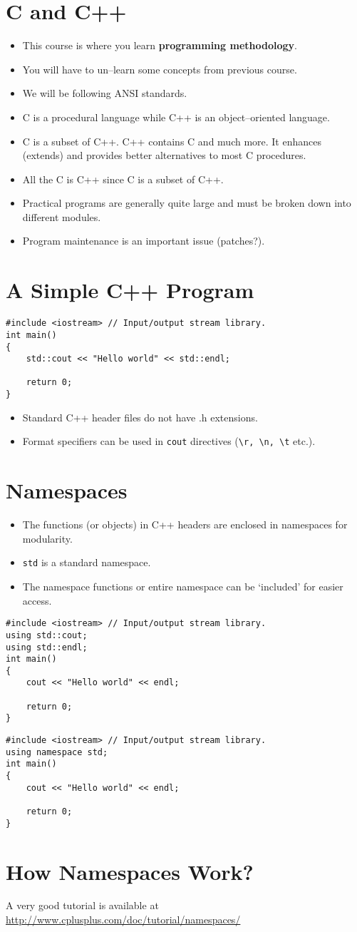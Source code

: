 \documentclass[12pt,a4paper]{article}
\begin{document}
\section{C and C++}
\begin{itemize}
\item This course is where you learn \textbf{programming methodology}.
\item You will have to un--learn some concepts from previous course.
\item We will be following ANSI standards.
\item C is a procedural language while C++ is an object--oriented language.
\item C is a subset of C++. C++ contains C and much more. It enhances (extends) and provides better alternatives to most C procedures.
\item All the C is C++ since C is a subset of C++.
\item Practical programs are generally quite large and must be broken down into different modules.
\item Program maintenance is an important issue (patches?).
\end{itemize}
\section{A Simple C++ Program}
\begin{lstlisting}[caption={A Basic C++ Program}]
#include <iostream> // Input/output stream library.
int main()
{
	std::cout << "Hello world" << std::endl;
	
	return 0;
}
\end{lstlisting}
\begin{itemize}
\item Standard C++ header files do not have .h extensions.
\item Format specifiers can be used in \verb|cout| directives (\verb|\r, \n, \t| etc.).
\end{itemize}
\section{Namespaces}
\begin{itemize}
\item The functions (or objects) in C++ headers are enclosed in namespaces for modularity.
\item \texttt{std} is a standard namespace.
\item The namespace functions or entire namespace can be `included' for easier access.
\end{itemize}
\begin{lstlisting}[caption={The `using' Directive}]
#include <iostream> // Input/output stream library.
using std::cout;
using std::endl;
int main()
{
	cout << "Hello world" << endl;
	
	return 0;
}
\end{lstlisting}
\begin{lstlisting}[caption={Including a Namespace}]
#include <iostream> // Input/output stream library.
using namespace std;
int main()
{
	cout << "Hello world" << endl;
	
	return 0;
}
\end{lstlisting}
\section{How Namespaces Work?}
A very good tutorial is available at \url{http://www.cplusplus.com/doc/tutorial/namespaces/}
\end{document}
